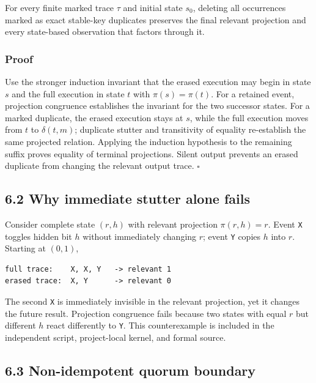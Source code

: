 \documentclass[10pt,a4paper]{article}
\begin{document}
For every finite marked trace \(\tau\) and initial state \(s_0\),
deleting all occurrences marked as exact stable-key duplicates preserves
the final relevant projection and every state-based observation that
factors through it.

\subsubsection{Proof}\label{proof-3}

Use the stronger induction invariant that the erased execution may begin
in state \(s\) and the full execution in state \(t\) with
\(\pi(s)=\pi(t)\). For a retained event, projection congruence
establishes the invariant for the two successor states. For a marked
duplicate, the erased execution stays at \(s\), while the full execution
moves from \(t\) to \(\delta(t,m)\); duplicate stutter and transitivity
of equality re-establish the same projected relation. Applying the
induction hypothesis to the remaining suffix proves equality of terminal
projections. Silent output prevents an erased duplicate from changing
the relevant output trace. \(\square\)

\subsection{6.2 Why immediate stutter alone
fails}\label{why-immediate-stutter-alone-fails}

Consider complete state \((r,h)\) with relevant projection
\(\pi(r,h)=r\). Event \texttt{X} toggles hidden bit \(h\) without
immediately changing \(r\); event \texttt{Y} copies \(h\) into \(r\).
Starting at \((0,1)\),

\begin{verbatim}
full trace:    X, X, Y   -> relevant 1
erased trace:  X, Y      -> relevant 0
\end{verbatim}

The second \texttt{X} is immediately invisible in the relevant
projection, yet it changes the future result. Projection congruence
fails because two states with equal \(r\) but different \(h\) react
differently to \texttt{Y}. This counterexample is included in the
independent script, project-local kernel, and formal source.

\subsection{6.3 Non-idempotent quorum
boundary}\label{non-idempotent-quorum-boundary}
\end{document}
